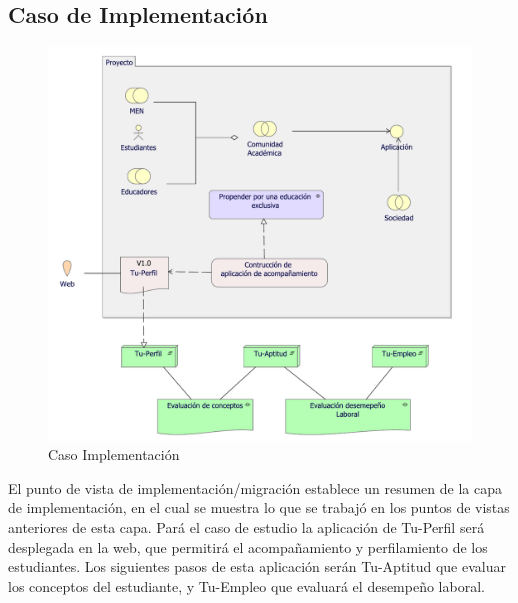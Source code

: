 \subsection{Caso  de Implementación}
\begin{figure}[h!]
	\centering
	\includegraphics[width=.9\linewidth]{imgs/caso/proyecto/implementacion_migracion.pdf}
	\caption{Caso Implementación}
\end{figure}
El punto de vista de implementación/migración establece un resumen de la capa de implementación, en el cual se muestra lo que se trabajó en los puntos de vistas anteriores de esta capa. Pará el caso de estudio la aplicación de Tu-Perfil será desplegada en la web, que permitirá el acompañamiento y perfilamiento de los estudiantes. Los siguientes pasos de esta aplicación serán Tu-Aptitud que evaluar los conceptos del estudiante, y Tu-Empleo que evaluará el desempeño laboral.